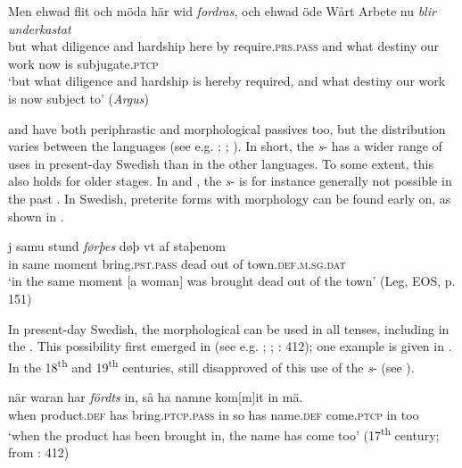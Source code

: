 \documentclass[output=paper]{langscibook}
\begin{document}
\ea\label{ex:intro:29}
\gll  Men  ehwad   flit         och   möda     här     wid \textit{fordras}, och ehwad öde   Wårt   Arbete nu \textit{blir} \textit{underkastat}\\
but   what   diligence and   hardship   here   by    require\textsc{.prs.pass} and what  destiny our     work   now   is     subjugate\textsc{.ptcp}\\
\glt ‘but what diligence and hardship is hereby required, and what destiny our work is now subject to’ (\textit{Argus})
\z

 and  have both periphrastic and morphological passives too, but the distribution varies between the languages (see e.g. \citealt{Engdahl2006}; \citealt{Laanemets2012}; \citealt{Faarlund2019}). In short, the \textit{s}{}- has a wider range of uses in present-day Swedish than in the other languages. To some extent, this also holds for older stages. In  and , the \textit{s}{}- is for instance generally not possible in the past . In Swedish, preterite forms with  morphology can be found early on, as shown in .


\ea\label{ex:intro:30}
\gll j     samu   stund \textit{førþes} døþ     vt     af staþenom\\
in   same     moment bring\textsc{.pst.pass}   dead     out   of town.\textsc{def.m.sg.dat}\\
\glt ‘in the same moment [a woman] was brought dead out of the town’ (Leg, EOS, p. 151)
\z


In present-day Swedish, the morphological  can be used in all tenses, including in the . This possibility first emerged in  (see e.g. \citealt{Holm1952}; \citealt{Platzack1989}; \citealt{Larsson2009}: 412); one example is given in . In the 18\textsuperscript{th} and 19\textsuperscript{th} centuries,  still disapproved of this use of the \textit{s}{}- (see \citealt{Platzack1989}).


\ea\label{ex:intro:31}
\gll när     waran       har \textit{fördts} in, så ha   namne      kom[m]it in mä.\\
  when product\textsc{.def}  has bring.\textsc{ptcp.pass}     in  so has name\textsc{.def} come\textsc{.ptcp} in too\\
\glt ‘when the product has been brought in, the name has come too’ (17\textsuperscript{th} century; from \citealt{Larsson2009}: 412)
\z
\end{document}
